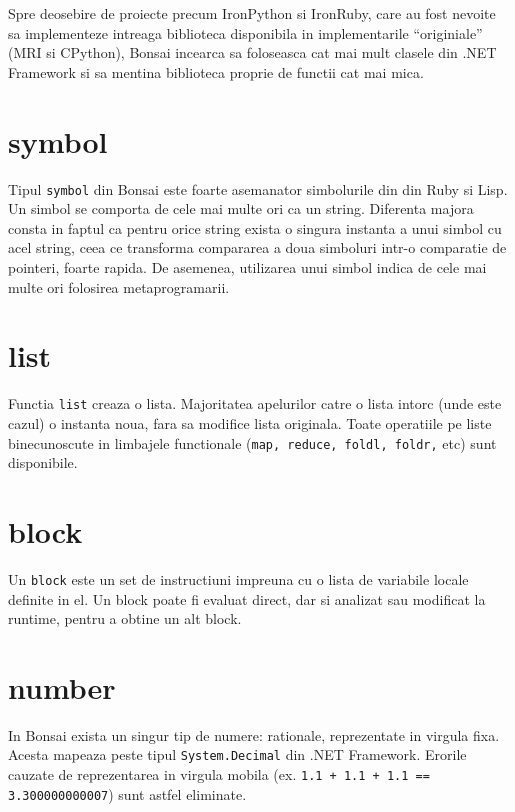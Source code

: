 \documentclass[12pt,a4paper]{report}
\begin{document}
Spre deosebire de proiecte precum IronPython si IronRuby, care au fost nevoite sa implementeze intreaga biblioteca disponibila in implementarile ``originiale'' (MRI si CPython), Bonsai incearca sa foloseasca cat mai mult clasele din .NET Framework si sa mentina biblioteca proprie de functii cat mai mica.

\section{symbol}

Tipul \texttt{symbol} din Bonsai este foarte asemanator simbolurile din din Ruby\cite{ruby_symbols} si Lisp\cite{clhs_symbols}. Un simbol se comporta de cele mai multe ori ca un string. Diferenta majora consta in faptul ca pentru orice string exista o singura instanta a unui simbol cu acel string, ceea ce transforma compararea a doua simboluri intr-o comparatie de pointeri, foarte rapida. De asemenea, utilizarea unui simbol indica de cele mai multe ori folosirea metaprogramarii. 

\section{list}

Functia \texttt{list} creaza o lista. Majoritatea apelurilor catre o lista intorc (unde este cazul) o instanta noua, fara sa modifice lista originala. Toate operatiile pe liste binecunoscute in limbajele functionale (\texttt{map, reduce, foldl, foldr,} etc) sunt disponibile.

\section{block}

Un \texttt{block} este un set de instructiuni impreuna cu o lista de variabile locale definite in el. Un block poate fi evaluat direct, dar si analizat sau modificat la runtime, pentru a obtine un alt block.

\section{number}

In Bonsai exista un singur tip de numere: rationale, reprezentate in virgula fixa. Acesta mapeaza peste tipul \texttt{System.Decimal} din .NET Framework. Erorile cauzate de reprezentarea in virgula mobila (ex. \texttt{1.1 + 1.1 + 1.1 == 3.300000000007}) sunt astfel eliminate.
\end{document}
